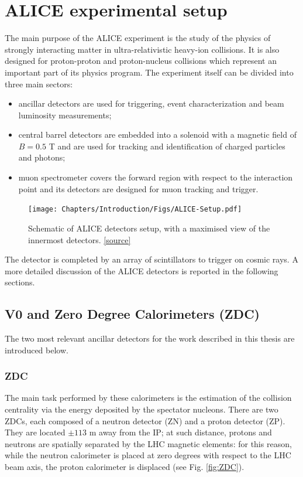 \section{ALICE experimental setup} %
\label{ALICE_apparatus}
The main purpose of the ALICE experiment is the study of the physics of strongly interacting matter in ultra-relativistic heavy-ion collisions. It is also designed for proton-proton and proton-nucleus collisions which represent an important part of its physics program. The experiment itself can be divided into three main sectors:
\begin{itemize}
    \item ancillar detectors are used for triggering, event characterization and beam luminosity measurements;
    \item central barrel detectors are embedded into a solenoid with a magnetic field of $B = 0.5$ T and are used for tracking and identification of charged particles and photons;
    \item muon spectrometer covers the forward region with respect to the interaction point and its detectors are designed for muon tracking and trigger.
\end{itemize}

\begin{figure}[!h]
\begin{center}
\texttt{[image: Chapters/Introduction/Figs/ALICE-Setup.pdf]}
\caption{Schematic of ALICE detectors setup, with a maximised view of the innermost detectors. \href{http://aliceinfo.cern.ch/Public/en/Chapter2/Chap2Experiment-en.html}{[source]}}
\label{fig:ALICEsetup}
\end{center}
\end{figure}

The detector is completed by an array of scintillators to trigger on cosmic rays.
A more detailed discussion of the ALICE detectors is reported in the following sections.

\subsection{V0 and Zero Degree Calorimeters (ZDC)}
The two most relevant ancillar detectors for the work described in this thesis are introduced below.

\subsubsection{ZDC}
The main task performed by these calorimeters is the estimation of the collision centrality via the energy deposited by the spectator nucleons. 
There are two ZDCs, each composed of a neutron detector (ZN) and a proton detector (ZP).
They are located $\pm113$ m away from the IP; at such distance, protons and neutrons are spatially separated by the LHC magnetic elements: for this reason, while the neutron calorimeter is placed at zero degrees with respect to the LHC beam axis, the proton calorimeter is displaced (see Fig. \ref{fig:ZDC}).

